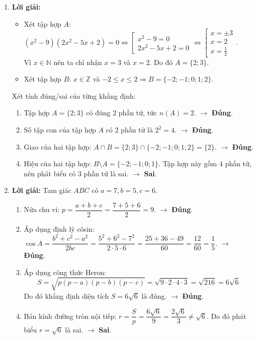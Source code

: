 \documentclass[12pt,a4paper]{article}
\begin{document}
\begin{enumerate}[resume]
\item \textbf{Lời giải:}
\begin{itemize}
    \item Xét tập hợp $A$: $(x^2 - 9)(2x^2 - 5x + 2) = 0 \Leftrightarrow \left[\begin{array}{l} x^2 - 9 = 0 \\ 2x^2 - 5x + 2 = 0 \end{array}\right. \Leftrightarrow \left[\begin{array}{l} x = \pm 3 \\ x = 2 \\ x = \frac{1}{2} \end{array}\right.$.\\
    Vì $x \in \mathbb{N}$ nên ta chỉ nhận $x = 3$ và $x = 2$. Do đó $A = \{2; 3\}$.
    \item Xét tập hợp $B$: $x \in \mathbb{Z}$ và $-2 \le x \le 2 \Rightarrow B = \{-2; -1; 0; 1; 2\}$.
\end{itemize}
Xét tính đúng/sai của từng khẳng định:
\begin{enumerate}
    \item Tập hợp $A = \{2; 3\}$ có đúng $2$ phần tử, tức $n(A) = 2$. $\rightarrow$ \textbf{Đúng}.
    \item Số tập con của tập hợp $A$ có $2$ phần tử là $2^2 = 4$. $\rightarrow$ \textbf{Đúng}.
    \item Giao của hai tập hợp: $A \cap B = \{2; 3\} \cap \{-2; -1; 0; 1; 2\} = \{2\}$. $\rightarrow$ \textbf{Đúng}.
    \item Hiệu của hai tập hợp: $B \setminus A = \{-2; -1; 0; 1\}$. Tập hợp này gồm $4$ phần tử, nên phát biểu có $3$ phần tử là sai. $\rightarrow$ \textbf{Sai}.
\end{enumerate}

\item \textbf{Lời giải:}
Tam giác $ABC$ có $a = 7, b = 5, c = 6$.
\begin{enumerate}
    \item Nửa chu vi: $p = \dfrac{a + b + c}{2} = \dfrac{7 + 5 + 6}{2} = 9$. $\rightarrow$ \textbf{Đúng}.
    \item Áp dụng định lý côsin: $\cos A = \dfrac{b^2 + c^2 - a^2}{2bc} = \dfrac{5^2 + 6^2 - 7^2}{2 \cdot 5 \cdot 6} = \dfrac{25 + 36 - 49}{60} = \dfrac{12}{60} = \dfrac{1}{5}$. $\rightarrow$ \textbf{Đúng}.
    \item Áp dụng công thức Heron:
    \[ S = \sqrt{p(p-a)(p-b)(p-c)} = \sqrt{9 \cdot 2 \cdot 4 \cdot 3} = \sqrt{216} = 6\sqrt{6} \]
    Do đó khẳng định diện tích $S = 6\sqrt{6}$ là đúng. $\rightarrow$ \textbf{Đúng}.
    \item Bán kính đường tròn nội tiếp: $r = \dfrac{S}{p} = \dfrac{6\sqrt{6}}{9} = \dfrac{2\sqrt{6}}{3} \ne \sqrt{6}$. Do đó phát biểu $r = \sqrt{6}$ là sai. $\rightarrow$ \textbf{Sai}.
\end{enumerate}
\end{enumerate}
\end{document}
